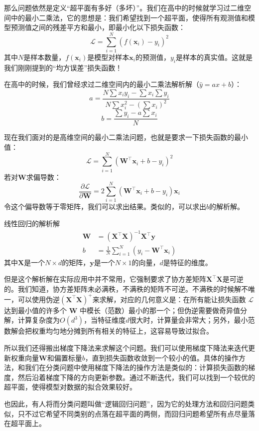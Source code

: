 那么问题依然是定义“超平面有多好（多坏）”。我们在高中的时候就学习过二维空间中的最小二乘法，它的思想是：我们希望找到一个超平面，使得所有观测值和模型预测值之间的残差平方和最小，即最小化以下损失函数：
\[ \mathcal{L} = \sum_{i=1}^{N} (f(\mathbf{x}_i) - y_i)^2 \]
其中$N$是样本数量，$f(\mathbf{x}_i)$是模型对样本$\mathbf{x}_i$的预测值，$y_i$是样本的真实值。这就是我们刚刚提到的“均方误差”损失函数！

在高中的时候，我们曾经求过二维空间内的最小二乘法解析解（$\hat{y} = a x + b$）：
\[ a = \frac{N\sum x_i y_i - \sum x_i \sum y_i}{N\sum x_i^2 - (\sum x_i)^2} \]
\[ b = \frac{\sum y_i - a \sum x_i}{N} \]

现在我们面对的是高维空间的最小二乘法问题，也就是要求一下损失函数的最小值：
\[ \mathcal{L} = \sum_{i=1}^{N} (\mathbf{W}^\top \mathbf{x}_i + b - y_i)^2 \]
若对$\mathbf{W}$求偏导数：
\[ \frac{\partial \mathcal{L}}{\partial \mathbf{W}} = 2 \sum_{i=1}^{N} (\mathbf{W}^\top \mathbf{x}_i + b - y_i) \mathbf{x}_i \]
令这个偏导数等于零矩阵，我们可以求出结果。类似的，可以求出$b$的解析解。

\begin{theorem}{线性回归的解析解}{}
\begin{align}
    \mathbf{W} &= (\mathbf{X}^\top \mathbf{X})^{-1} \mathbf{X}^\top \mathbf{y} \\
    b &= \frac{1}{N} \sum_{i=1}^{N} (y_i - \mathbf{W}^\top \mathbf{x}_i)
\end{align}
其中$\mathbf{X}$是一个$N \times d$的矩阵，$\mathbf{y}$是一个$N \times 1$的向量，$d$是特征的维度。
\end{theorem}

但是这个解析解在实际应用中并不常用，它强制要求了协方差矩阵$\mathbf{X}^\top \mathbf{X}$是可逆的。我们知道，协方差矩阵未必满秩，不满秩的矩阵不可逆。不满秩的时候解不唯一，可以使用伪逆$(\mathbf{X}^\top \mathbf{X})^+$来求解，对应的几何意义是：在所有能让损失函数 $\mathcal{L}$ 达到最小值的许多个 $\mathbf{W}$ 中模长（范数）最小的那一个；但伪逆需要做奇异值分解，计算复杂度为$O(d^3)$，当特征维度$d$很大时，计算量会非常大；另外，最小范数解会把权重均匀地分摊到所有相关的特征上，这容易导致过拟合。

所以我们还得搬出梯度下降法来求解这个问题。我们可以使用梯度下降法来迭代更新权重向量$\mathbf{W}$和偏置标量$b$，直到损失函数收敛到一个较小的值。具体的操作方法，和我们在分类问题中使用梯度下降法的操作方法是类似的：计算损失函数的梯度，然后沿着梯度下降的方向更新参数。通过不断迭代，我们可以找到一个较优的超平面，使得模型对数据的拟合效果较好。

也因此，有人将而分类问题叫做“逻辑回归问题”，因为它的处理方法和回归问题类似，只不过它希望不同类别的点落在超平面的两侧，而回归问题希望所有点尽量落在超平面上。

